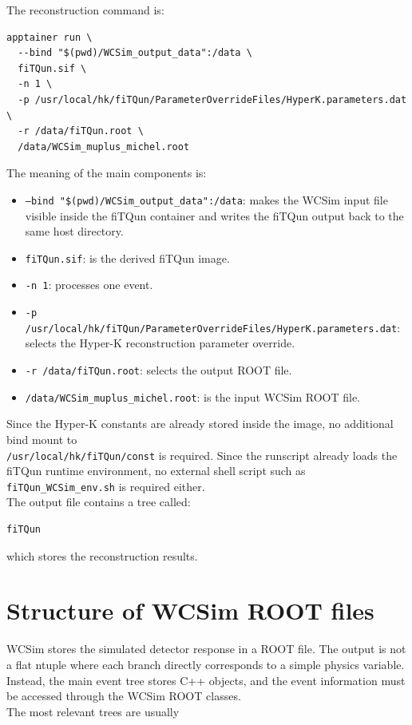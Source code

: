 \documentclass{article}
\numberwithin{table}{subsection}
\numberwithin{figure}{subsection}
\numberwithin{equation}{subsection}
\numberwithin{footnote}{subsection}
\begin{document}
The reconstruction command is:
\begin{lstlisting}[style=terminal]
apptainer run \
  --bind "$(pwd)/WCSim_output_data":/data \
  fiTQun.sif \
  -n 1 \
  -p /usr/local/hk/fiTQun/ParameterOverrideFiles/HyperK.parameters.dat \
  -r /data/fiTQun.root \
  /data/WCSim_muplus_michel.root
\end{lstlisting}
The meaning of the main components is:
\begin{itemize}
    \item \texttt{--bind "\$(pwd)/WCSim\_output\_data":/data}: makes the WCSim input file visible inside the fiTQun container and writes the fiTQun output back to the same host directory.
    \item \texttt{fiTQun.sif}: is the derived fiTQun image.
    \item \texttt{-n 1}: processes one event.
    \item \texttt{-p /usr/local/hk/fiTQun/ParameterOverrideFiles/HyperK.parameters.dat}: selects the Hyper-K reconstruction parameter override.
    \item \texttt{-r /data/fiTQun.root}: selects the output ROOT file.
    \item \texttt{/data/WCSim\_muplus\_michel.root}: is the input WCSim ROOT file.
\end{itemize}
Since the Hyper-K constants are already stored inside the image, no additional bind mount to\\
\texttt{/usr/local/hk/fiTQun/const} is required. Since the runscript already loads the fiTQun runtime environment, no external shell script such as \texttt{fiTQun\_WCSim\_env.sh} is required either.\\
The output file contains a tree called:
\begin{lstlisting}[style=terminal]
fiTQun
\end{lstlisting}
which stores the reconstruction results.



\section{Structure of WCSim ROOT files}
\label{sec:wcsim_object_hierarchy}

WCSim stores the simulated detector response in a ROOT file. The output is not a
flat ntuple where each branch directly corresponds to a simple physics variable.
Instead, the main event tree stores C++ objects, and the event information must
be accessed through the WCSim ROOT classes.\\
The most relevant trees are usually
\end{document}
